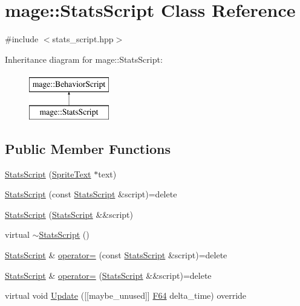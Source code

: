\hypertarget{classmage_1_1_stats_script}{}\section{mage\+:\+:Stats\+Script Class Reference}
\label{classmage_1_1_stats_script}


{\ttfamily \#include $<$stats\+\_\+script.\+hpp$>$}

Inheritance diagram for mage\+:\+:Stats\+Script\+:\begin{figure}[H]
\begin{center}
\leavevmode
\includegraphics[height=2.000000cm]{classmage_1_1_stats_script}
\end{center}
\end{figure}
\subsection*{Public Member Functions}
\begin{DoxyCompactItemize}
\item 
\hyperlink{classmage_1_1_stats_script_a1deb5458611675fc99309edd01d285f8}{Stats\+Script} (\hyperlink{classmage_1_1_sprite_text}{Sprite\+Text} $\ast$text)
\item 
\hyperlink{classmage_1_1_stats_script_aab237b7c391d7ca7ad96cfa33a3aac81}{Stats\+Script} (const \hyperlink{classmage_1_1_stats_script}{Stats\+Script} \&script)=delete
\item 
\hyperlink{classmage_1_1_stats_script_af511d7e2e6bec30cd05782de94c65abe}{Stats\+Script} (\hyperlink{classmage_1_1_stats_script}{Stats\+Script} \&\&script)
\item 
virtual \hyperlink{classmage_1_1_stats_script_a65ba91e19c78c99831a65ad6dd6bb149}{$\sim$\+Stats\+Script} ()
\item 
\hyperlink{classmage_1_1_stats_script}{Stats\+Script} \& \hyperlink{classmage_1_1_stats_script_a7da39f1c0cc417dabdc539f49deec7c3}{operator=} (const \hyperlink{classmage_1_1_stats_script}{Stats\+Script} \&script)=delete
\item 
\hyperlink{classmage_1_1_stats_script}{Stats\+Script} \& \hyperlink{classmage_1_1_stats_script_a6adacd651debb83254e1121f32c8f21e}{operator=} (\hyperlink{classmage_1_1_stats_script}{Stats\+Script} \&\&script)=delete
\item 
virtual void \hyperlink{classmage_1_1_stats_script_a61ada9e05bce5699cdf5912cce90337b}{Update} (\mbox{[}\mbox{[}maybe\+\_\+unused\mbox{]}\mbox{]} \hyperlink{namespacemage_ad26233bbec640deda836e572c1a23708}{F64} delta\+\_\+time) override
\end{DoxyCompactItemize}
